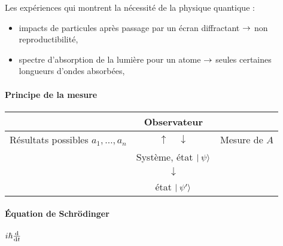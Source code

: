 Les expériences qui montrent la nécessité de la physique quantique :
\begin{itemize}
  \item[\textbullet] impacts de particules après passage par un écran diffractant $\rightarrow$ non reproductibilité,
  \item[\textbullet] spectre d'absorption de la lumière pour un atome $\rightarrow$ seules certaines longueurs d'ondes absorbées,
\end{itemize}

\paragraph{Principe de la mesure}
	\begin{tabular}{|c|c|c|}
	\hline 
	& Observateur & \\ 
	\hline 
	Résultats possibles $a_1,\ldots,a_n$ & $\uparrow \quad \downarrow$ & Mesure de $A$ \\ 
	\hline 
	& Système, état $\mid \psi \rangle$ & \\ 
	\hline 
	& $\downarrow$ & \\
	\hline
	& état $\mid \psi ' \rangle$ & \\
	\end{tabular} 

\paragraph{Équation de Schrödinger}
  $i \hbar \frac{\mathop{}\mathopen{}\mathrm{d}}{\mathop{}\mathopen{}\mathrm{d} t}$
  
